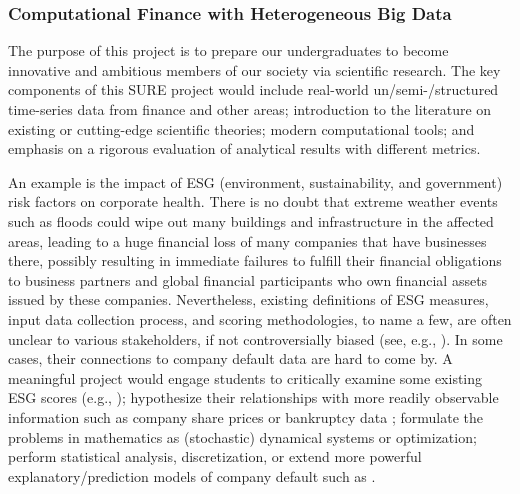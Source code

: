 
\subsubsection{Computational Finance with Heterogeneous Big Data}

The purpose of this project is to prepare our undergraduates to become innovative and ambitious members of our society via scientific research.   The key components of this SURE project would include real-world un/semi-/structured time-series data from finance and other areas; introduction to the literature on existing or cutting-edge scientific theories; modern computational tools; and emphasis on a rigorous evaluation of analytical results with different metrics. 

An example is the impact of ESG (environment, sustainability, and government) risk factors on corporate  health. There is no doubt that extreme weather events such as floods could wipe out many buildings and infrastructure in the affected areas, leading to a huge financial loss of many companies that have businesses there, possibly resulting in immediate failures to fulfill their financial obligations to business partners and global financial participants who own financial assets issued by these companies. Nevertheless, existing definitions of ESG measures,  input data collection process, and scoring methodologies, to name a few, are often  unclear to various stakeholders, if not controversially biased (see, e.g., \cite{reiser2019buyer}). In some cases, their connections to company default data are hard to come by. A meaningful project would engage students to critically examine some existing ESG scores (e.g., \cite{friede2015esg}); hypothesize their relationships with more readily observable information  such as company share prices or bankruptcy data \cite{pedersen2020responsible, fatemi2018esg}; formulate the problems in mathematics as (stochastic) dynamical systems or optimization; perform statistical analysis, discretization, or extend more powerful explanatory/prediction models of company default such as \cite{jarrow2005default}.

